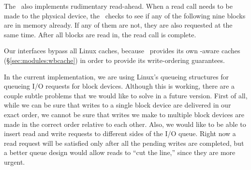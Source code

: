 The \module\ also implements rudimentary read-ahead. When a read call needs to
be made to the physical device, the \module\ checks to see if any of the
following nine blocks are in memory already. If any of them are not, they are
also requested at the same time. After all blocks are read in, the read call is
complete.

Our interfaces bypass all Linux caches, because \Kudos\ provides its own
\chdesc-aware caches (\S\ref{sec:modules:wbcache}) in order to provide its
write-ordering guarantees.

In the current implementation, we are using Linux's queueing structures for
queueing I/O requests for block devices. Although this is working, there are a
couple subtle problems that we would like to solve in a future version. First of
all, while we can be sure that writes to a single block device are delivered in
our exact order, we cannot be sure that writes we make to multiple block devices
are made in the correct order relative to each other. Also, we would like to be
able to insert read and write requests to different sides of the I/O queue.
Right now a read request will be satisfied only after all the pending writes
are completed, but a better queue design would allow reads to ``cut the line,''
since they are more urgent.
